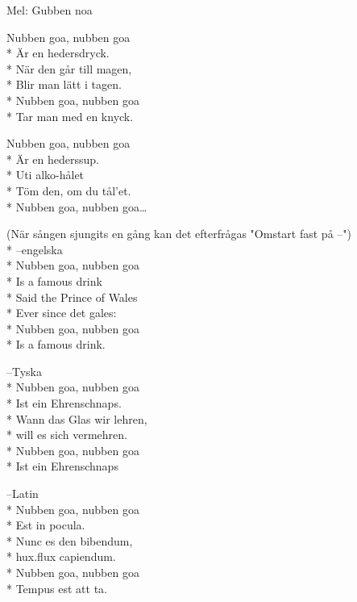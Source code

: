\begin{SongText}
\begin{SongInfo}
    Mel: Gubben noa
\end{SongInfo}
\begin{SongVerse}
    Nubben goa, nubben goa\\*%
    Är en hedersdryck.\\*%
    När den går till magen,\\*%
    Blir man lätt i tagen.\\*%
    Nubben goa, nubben goa\\*%
    Tar man med en knyck.
\end{SongVerse}
\begin{SongVerse}
    Nubben goa, nubben goa\\*%
    Är en hederssup.\\*%
    Uti alko-hålet\\*%
    Töm den, om du tål’et.\\*%
    Nubben goa, nubben goa…
\end{SongVerse}
\begin{SongVerse}
    (När sången sjungits en gång kan det efterfrågas "Omstart fast på --")\\*%
    --engelska\\*%
    Nubben goa, nubben goa\\*%
    Is a famous drink\\*%
    Said the Prince of Wales\\*%
    Ever since det gales:\\*%
    Nubben goa, nubben goa\\*%
    Is a famous drink.
\end{SongVerse}
\begin{SongVerse}
    --Tyska\\*%
    Nubben goa, nubben goa\\*%
    Ist ein Ehrenschnaps.\\*%
    Wann das Glas wir lehren,\\*%
    will es sich vermehren.\\*%
    Nubben goa, nubben goa\\*%
    Ist ein Ehrenschnaps
\end{SongVerse}
\begin{SongVerse}
    --Latin\\*%
    Nubben goa, nubben goa\\*%
    Est in pocula.\\*%
    Nunc es den bibendum,\\*%
    hux.flux capiendum.\\*%
    Nubben goa, nubben goa\\*%
    Tempus est att ta.
\end{SongVerse}
\end{SongText}

